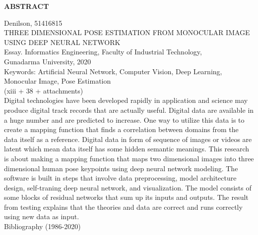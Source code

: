 \newpage %
\begin{center}
    \begin{large}\textbf{ABSTRACT}\end{large}
\end{center}

\vspace{5mm}

\noindent Denilson, 51416815 \\
THREE DIMENSIONAL POSE ESTIMATION FROM MONOCULAR IMAGE USING DEEP NEURAL NETWORK\\
Essay. Informatics Engineering, Faculty of Industrial Technology, \\
Gunadarma University, 2020\\
Keywords: Artificial Neural Network, Computer Vision, Deep Learning, Monocular Image, Pose Estimation\\
\noindent (xiii + 38 + attachments)\\

Digital technologies have been developed rapidly in application and science may produce digital track
records that are actually useful. Digital data are available in a huge number and are predicted to increase.
One way to utilize this data is to create a mapping function that finds a correlation between domains
from the data itself as a reference. Digital data in form of sequence of images or videos are latent
which mean data itself has some hidden semantic meanings. This research is about making a mapping
function that maps two dimensional images into three dimensional human pose keypoints using
deep neural network modeling. The software is built in steps that involve data preprocessing,
model architecture design, self-traning deep neural network, and visualization. The model consists of
some blocks of residual networks that sum up its inputs and outputs. The result from testing explains
that the theories and data are correct and runs correctly using new data as input.\\

\noindent Bibliography (1986-2020)